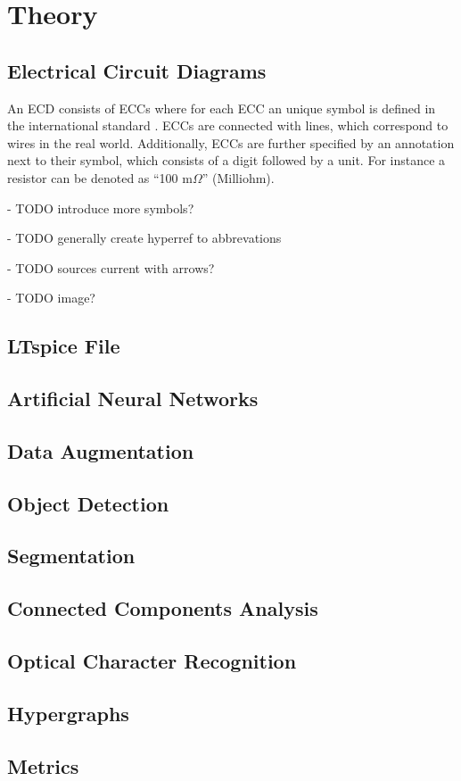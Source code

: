 \chapter{Theory}

\section{Electrical Circuit Diagrams}

An \ac{ECD} consists of \ac{ECCs} where for each \ac{ECC} an unique symbol is defined in the international standard \cite{iec60617}.
\ac{ECCs} are connected with lines, which correspond to wires in the real world.
Additionally, \ac{ECCs} are further specified by an annotation next to their symbol, which consists of a digit followed by a unit.
For instance a resistor can be denoted as ``100 m$\Omega$'' (Milliohm).

- TODO introduce more symbols?

- TODO generally create hyperref to abbrevations

- TODO sources current with arrows?

- TODO image?

\section{LTspice File}


\section{Artificial Neural Networks}


\section{Data Augmentation}

\section{Object Detection}


\section{Segmentation}


\section{Connected Components Analysis}


\section{Optical Character Recognition}

\section{Hypergraphs}


\section{Metrics}
